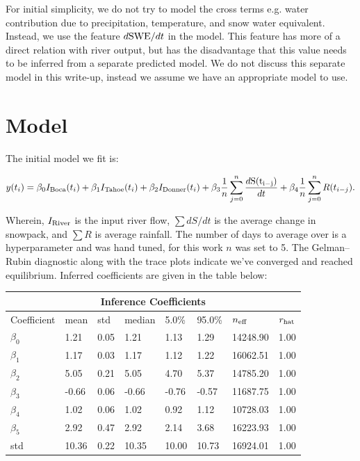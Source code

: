 \documentclass[11pt]{article}
\begin{document}
\noindent
For initial simplicity, we do not try to model the cross terms e.g. water contribution due to precipitation, temperature, and snow water equivalent. Instead, we use the feature $  d {\rm SWE} / dt $ in the model. This feature has more of a direct relation with river output, but has the disadvantage that this value needs to be inferred from a separate predicted model. We do not discuss this separate model in this write-up, instead we assume we have an appropriate model to use.

\section{Model}

The initial model we fit is:

$$
y(t_i) = \beta_0 I_{\rm Boca} (t_i) + \beta_1 I_{\rm Tahoe} (t_i) + \beta_2 I_{\rm Donner} (t_i) + \beta_3 \frac{1}{n} \sum_{j{=}0}^n  \frac{d {\rm S(t_{i-j})}}{dt} + \beta_4  \frac{1}{n} \sum_{j{=}0}^n R(t_{i - j}).
$$

\noindent
Wherein, $I_{\rm River}$ is the input river flow, $\sum dS/dt$ is the average change in snowpack, and $\sum R$ is average rainfall. The number of days to average over is a hyperparameter and was hand tuned, for this work $n$ was set to 5. The Gelman–Rubin diagnostic along with the trace plots indicate we've converged and reached equilibrium. Inferred coefficients are given in the table below:
 

\begin{center}
\begin{tabular}{ |p{2cm}||p{1.5cm}|p{1.5cm}|p{1.5cm}|p{1.5cm}|p{1.5cm}|p{1.5cm}|p{1.5cm}|  }
 \hline
 \multicolumn{8}{|c|}{Inference Coefficients} \\
 \hline
 Coefficient & mean & std & median & 5.0\% & 95.0\% & $n_{\rm eff}$ & $r_{\rm hat}$ \\
 \hline
$\beta_0$  &   1.21  &   0.05  &   1.21  &   1.13  &   1.29 &  14248.90  &   1.00 \\
$\beta_1$  &   1.17  &   0.03  &   1.17  &   1.12  &   1.22 &  16062.51  &   1.00 \\
$\beta_2$  &   5.05  &   0.21  &   5.05  &   4.70  &   5.37 &  14785.20  &   1.00 \\
$\beta_3$  &  -0.66  &   0.06  &  -0.66  &  -0.76  &  -0.57 &  11687.75  &   1.00 \\
$\beta_4$  &   1.02  &   0.06  &   1.02  &   0.92  &   1.12 &  10728.03  &   1.00 \\
$\beta_5$  &   2.92  &   0.47  &   2.92  &   2.14  &   3.68 &  16223.93  &   1.00 \\
std        &  10.36  &   0.22  &  10.35  &  10.00  &  10.73 &  16924.01  &   1.00 \\
 \hline
\end{tabular}
\end{center}
\end{document}
